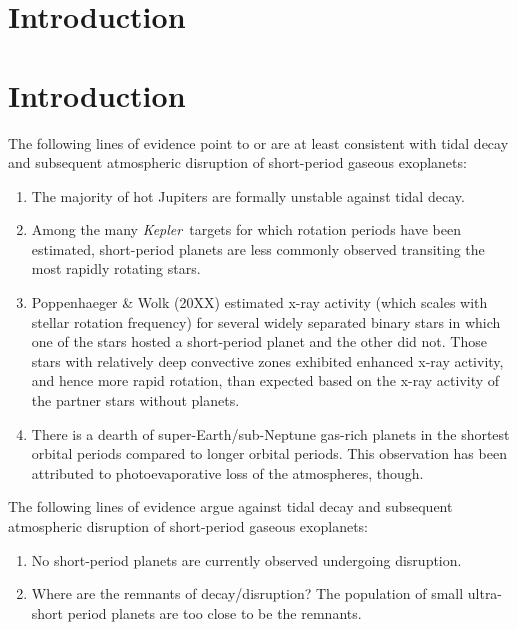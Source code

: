 \documentclass[smallcondensed]{svjour3}    %
\newcommand{\kepler}{\emph{Kepler}}
\begin{document}
\section{Introduction}
\label{sec:introduction}

\section{Introduction}

The following lines of evidence point to or are at least consistent with tidal decay and subsequent atmospheric disruption of short-period gaseous exoplanets:

\begin{enumerate}
\item The majority of hot Jupiters are formally unstable against tidal decay.

\item Among the many \kepler\ targets for which rotation periods have been estimated, short-period planets are less commonly observed transiting the most rapidly rotating stars.

\item Poppenhaeger \& Wolk (20XX) estimated x-ray activity (which scales with stellar rotation frequency) for several widely separated binary stars in which one of the stars hosted a short-period planet and the other did not. Those stars with relatively deep convective zones exhibited enhanced x-ray activity, and hence more rapid rotation, than expected based on the x-ray activity of the partner stars without planets. 

\item There is a dearth of super-Earth/sub-Neptune gas-rich planets in the shortest orbital periods compared to longer orbital periods. This observation has been attributed to photoevaporative loss of the atmospheres, though.

\end{enumerate}

The following lines of evidence argue against tidal decay and subsequent atmospheric disruption of short-period gaseous exoplanets:

\begin{enumerate}

\item No short-period planets are currently observed undergoing disruption.

\item Where are the remnants of decay/disruption? The population of small ultra-short period planets are too close to be the remnants.

\end{enumerate}
\end{document}
